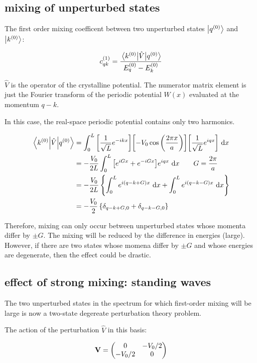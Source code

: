 \documentclass[10pt, a4paper, twocolumn]{article}
\begin{document}
\subsection{mixing of unperturbed states}

The first order mixing coefficent between two unperturbed states $\ket{q^{(0)}}$ and $\ket{k^{(0)}}$:

\[ c_{qk}^{(1)} = \frac{\mel{k^{(0)}}{\hat V}{q^{(0)}}}
{E_q^{(0)} - E_k^{(0)}} \]

$\hat V$ is the operator of the crystalline potential. The numerator matrix element is just the Fourier transform of the periodic potential $W(x)$ evaluated at the momentum $q-k$.

In this case, the real-space periodic potential contains only two harmonics.

\begin{equation*}
\begin{aligned}
\mel{k^{(0)}}{\hat V}{q^{(0)}} &=
\int _0^L \qty[\frac{1}{\sqrt L} e^{-ikx}]
\qty[-V_0 \cos \qty(\frac{2\pi x}{a})]
\qty[\frac{1}{\sqrt L} e^{iqx}] \ \dd x
\\&=-\frac{V_0}{2L}\int _0^L \qty[e^{iGx}+e^{-iGx}]
e^{iqx} \ \dd x
\qquad G = \frac{2\pi}{a}
\\&= -\frac{V_0}{2L}
\left\{
\int_0^L e^{i(q-k+G)x} \ \dd x
+ \int_0^L e^{i(q-k-G)x} \ \dd x \right\}
\\&= -\frac{V_0}{2}
\left\{ \delta _{q-k+G,0} + \delta _{q-k-G,0} \right\}
\end{aligned}
\end{equation*}

Therefore, mixing can only occur between unperturbed states whose momenta differ by $\pm G$. The mixing will be reduced by the difference in energies (large). However, if there are two states whose momena differ by $\pm G$ and whose energies are degenerate, then the effect could be drastic.

\subsection{effect of strong mixing: standing waves}

The two unperturbed states in the spectrum for which first-order mixing will be large is now a two-state degereate perturbation theory problem.

The action of the perturbation $\hat V$ in this basis:

\[\vb V = \mqty(0&-V_0/2\\-V_0/2&0) \]
\end{document}
